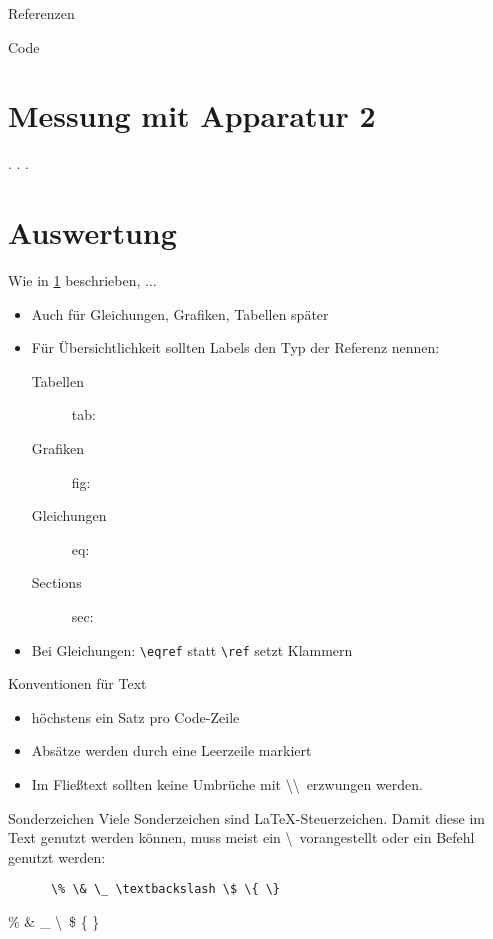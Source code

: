 \begin{frame}[fragile]{Referenzen}
  \begin{block}{Code}
    \begin{lstverbatim}
    \section{Messung mit Apparatur 2}
    \label{sec:apparatur2}
    . . .
    \section{Auswertung}
    Wie in \ref{sec:apparatur2} beschrieben, ...
    \end{lstverbatim}
  \end{block}
  \begin{itemize}
    \item Auch für Gleichungen, Grafiken, Tabellen \mbox{\rightarrow} später
    \item Für Übersichtlichkeit sollten Labels den Typ der Referenz nennen:
      \begin{description}
        \item[Tabellen] tab:
        \item[Grafiken] fig:
        \item[Gleichungen] eq:
        \item[Sections] sec:
      \end{description}
    \item Bei Gleichungen: \verb+\eqref+ statt \verb+\ref+ \mbox{\rightarrow} setzt Klammern
  \end{itemize}
\end{frame}

\begin{frame}[fragile]{Konventionen für Text}
  \begin{itemize}
    \item höchstens ein Satz pro Code-Zeile
    \item Absätze werden durch eine Leerzeile markiert
    \item Im Fließtext sollten keine Umbrüche mit \textbackslash\textbackslash\  erzwungen werden.
  \end{itemize}
  \begin{alertblock}{Sonderzeichen}
    Viele Sonderzeichen sind \LaTeX-Steuerzeichen.
    Damit diese im Text genutzt werden können, muss meist ein \textbackslash\ vorangestellt oder ein Befehl genutzt werden:
    \begin{center}
      \begin{lstlisting}
      \% \& \_ \textbackslash \$ \{ \}
      \end{lstlisting}
      \% \& \_ \textbackslash\ \$ \{ \}
    \end{center}
  \end{alertblock}
\end{frame}

